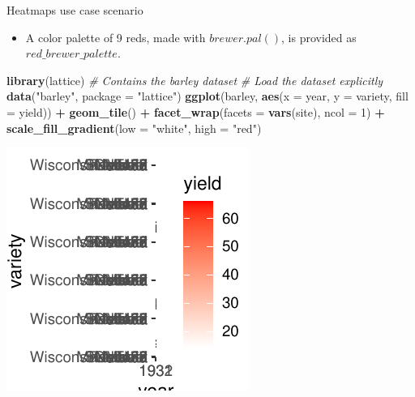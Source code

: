 \documentclass[
  ignorenonframetext,
]{beamer}
\newenvironment{Shaded}{\begin{snugshade}}{\end{snugshade}}
\newcommand{\AttributeTok}[1]{\textcolor[rgb]{0.13,0.29,0.53}{#1}}
\newcommand{\CommentTok}[1]{\textcolor[rgb]{0.56,0.35,0.01}{\textit{#1}}}
\newcommand{\DecValTok}[1]{\textcolor[rgb]{0.00,0.00,0.81}{#1}}
\newcommand{\FunctionTok}[1]{\textcolor[rgb]{0.13,0.29,0.53}{\textbf{#1}}}
\newcommand{\NormalTok}[1]{#1}
\newcommand{\SpecialCharTok}[1]{\textcolor[rgb]{0.81,0.36,0.00}{\textbf{#1}}}
\newcommand{\StringTok}[1]{\textcolor[rgb]{0.31,0.60,0.02}{#1}}
\providecommand{\tightlist}{%
  \setlength{\itemsep}{0pt}\setlength{\parskip}{0pt}}
\begin{document}
\begin{frame}[fragile]{Heatmaps use case scenario}
\label{heatmaps-use-case-scenario-6}
\begin{itemize}
\tightlist
\item
  A color palette of 9 reds, made with \(brewer.pal()\), is provided as
  \(red\_brewer\_palette\).
\end{itemize}


\begin{Shaded}
\begin{Highlighting}[]
\FunctionTok{library}\NormalTok{(lattice)  }\CommentTok{\# Contains the \textquotesingle{}barley\textquotesingle{} dataset}
\CommentTok{\# Load the dataset explicitly}
\FunctionTok{data}\NormalTok{(}\StringTok{"barley"}\NormalTok{, }\AttributeTok{package =} \StringTok{"lattice"}\NormalTok{)}
\FunctionTok{ggplot}\NormalTok{(barley, }\FunctionTok{aes}\NormalTok{(}\AttributeTok{x =}\NormalTok{ year, }\AttributeTok{y =}\NormalTok{ variety, }\AttributeTok{fill =}\NormalTok{ yield)) }\SpecialCharTok{+} \FunctionTok{geom\_tile}\NormalTok{() }\SpecialCharTok{+}
    \FunctionTok{facet\_wrap}\NormalTok{(}\AttributeTok{facets =} \FunctionTok{vars}\NormalTok{(site), }\AttributeTok{ncol =} \DecValTok{1}\NormalTok{) }\SpecialCharTok{+} \FunctionTok{scale\_fill\_gradient}\NormalTok{(}\AttributeTok{low =} \StringTok{"white"}\NormalTok{,}
    \AttributeTok{high =} \StringTok{"red"}\NormalTok{)}
\end{Highlighting}
\end{Shaded}

\begin{center}\includegraphics[width=0.5\linewidth]{Figs/unnamed-chunk-113-1} \end{center}
\end{frame}
\end{document}
